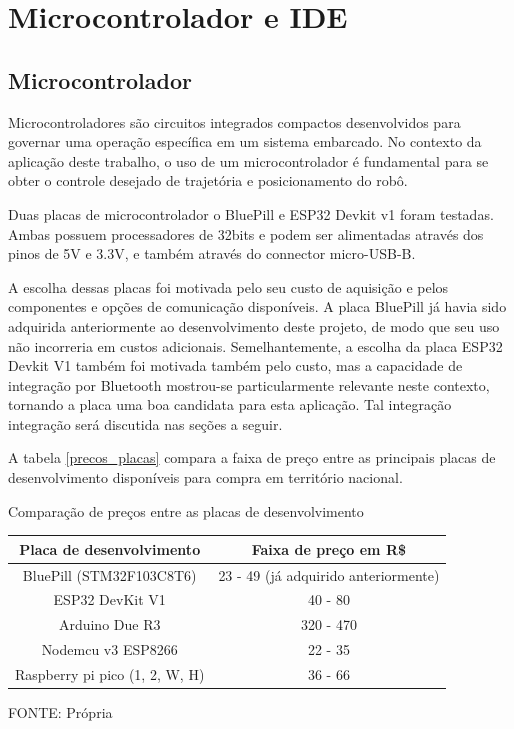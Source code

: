 
\section{Microcontrolador e IDE}

\subsection{Microcontrolador}

Microcontroladores são circuitos integrados compactos desenvolvidos para governar
uma operação específica em um sistema embarcado. No contexto da aplicação deste
trabalho, o uso de um microcontrolador é fundamental para se obter o controle
desejado de trajetória e posicionamento do robô.

Duas placas de microcontrolador o BluePill e ESP32 Devkit v1 foram testadas.
Ambas possuem processadores de 32bits e podem ser alimentadas através dos pinos
de 5V e 3.3V, e também através do connector micro-USB-B.

A escolha dessas placas foi motivada pelo seu custo de aquisição e pelos
componentes e opções de comunicação disponíveis. A placa BluePill já havia sido
adquirida anteriormente ao desenvolvimento deste projeto, de modo que seu uso
não incorreria em custos adicionais. Semelhantemente, a escolha da placa ESP32
Devkit V1 também foi motivada também pelo custo, mas a capacidade de integração
por Bluetooth mostrou-se particularmente relevante neste contexto, tornando a
placa uma boa candidata para esta aplicação. Tal integração integração será
discutida nas seções a seguir.

A tabela \ref{precos_placas} compara a faixa de preço entre as principais
placas de desenvolvimento disponíveis para compra em território nacional.

\begin{quadro}[htb]
	\caption{Comparação de preços entre as placas de desenvolvimento
	\label{precos_placas}}
	 \begin{tabular}{|c|c|}
		\hline
		\textbf{Placa de desenvolvimento} & \textbf{Faixa de preço em R\$} \\ \hline
		BluePill (STM32F103C8T6) &  23 - 49 (já adquirido anteriormente) \\ \hline
		ESP32 DevKit V1  &  40 - 80   \\ \hline
		Arduino Due R3 &  320 - 470   \\ \hline
		Nodemcu v3 ESP8266 & 22 - 35   \\ \hline
		Raspberry pi pico (1, 2, W, H)  & 36 - 66  \\ \hline
	\end{tabular}
	\caption*{FONTE: Própria}
\end{quadro}

